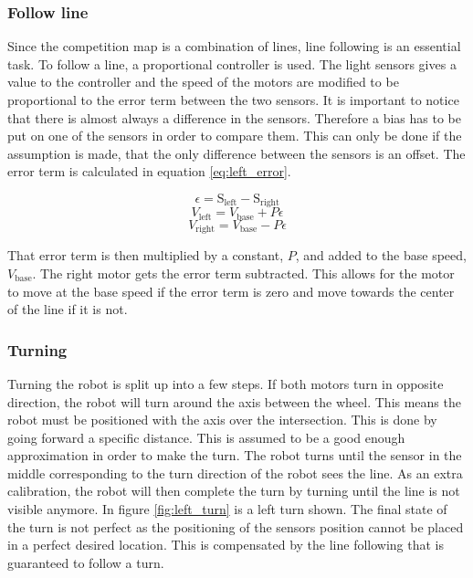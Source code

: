 \subsubsection{Follow line}
Since the competition map is a combination of lines, line following is an essential task.
To follow a line, a proportional controller is used.
The light sensors gives a value to the controller and the speed of the motors are modified to be proportional to the error term between the two sensors.
It is important to notice that there is almost always a difference in the sensors. 
Therefore a bias has to be put on one of the sensors in order to compare them.
This can only be done if the assumption is made, that the only difference between the sensors is an offset.
The error term is calculated in equation \ref{eq:left_error}.

\begin{equation}
  \epsilon = \text{S}_{\text{left}} - \text{S}_{\text{right}}
 \label{eq:left_error}
\end{equation}
\begin{equation}
  V_\text{left} = V_\text{base} + P \epsilon
 \label{eq:left_speed}
\end{equation}
\begin{equation}
  V_\text{right} = V_\text{base} - P \epsilon
 \label{eq:right_speed}
\end{equation}

That error term is then multiplied by a constant, $P$, and added to the base speed, $V_\text{base}$.
The right motor gets the error term subtracted.
This allows for the motor to move at the base speed if the error term is zero and move towards the center of the line if it is not.

\subsubsection{Turning}
Turning the robot is split up into a few steps.
If both motors turn in opposite direction, the robot will turn around the axis between the wheel.
This means the robot must be positioned with the axis over the intersection.
This is done by going forward a specific distance.
This is assumed to be a good enough approximation in order to make the turn.
The robot turns until the sensor in the middle corresponding to the turn direction of the robot sees the line.
As an extra calibration, the robot will then complete the turn by turning until the line is not visible anymore.
In figure \ref{fig:left_turn} is a left turn shown.
The final state of the turn is not perfect as the positioning of the sensors position cannot be placed in a perfect desired location.
This is compensated by the line following that is guaranteed to follow a turn.

